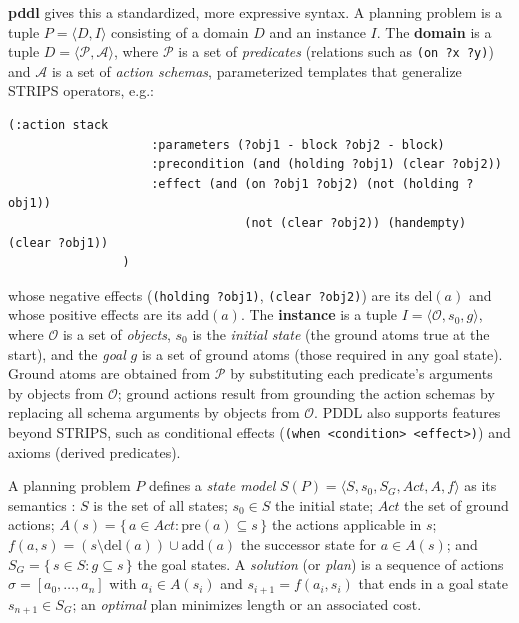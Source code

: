 \textbf{\ac{pddl}} \cite{aeronautiques1998pddl} gives this a standardized, more expressive syntax. A planning problem is a tuple $P = \langle D, I \rangle$ consisting of a domain $D$ and an instance $I$. The \textbf{domain} is a tuple $D = \langle \mathcal{P}, \mathcal{A} \rangle$, where $\mathcal{P}$ is a set of \textit{predicates} (relations such as \texttt{(on ?x ?y)}) and $\mathcal{A}$ is a set of \textit{action schemas}, parameterized templates that generalize STRIPS operators, e.g.:
            \begin{lstlisting}[style=PDDL,  label=lst:pddl_stack_action]
                (:action stack
                    :parameters (?obj1 - block ?obj2 - block)
                    :precondition (and (holding ?obj1) (clear ?obj2))
                    :effect (and (on ?obj1 ?obj2) (not (holding ?obj1))
                                 (not (clear ?obj2)) (handempty) (clear ?obj1))
                )

            \end{lstlisting}
whose negative effects (\texttt{(holding ?obj1)}, \texttt{(clear ?obj2)}) are its $\mathrm{del}(a)$ and whose positive effects are its $\mathrm{add}(a)$. The \textbf{instance} is a tuple $I = \langle \mathcal{O}, s_0, g \rangle$, where $\mathcal{O}$ is a set of \textit{objects}, $s_0$ is the \textit{initial state} (the ground atoms true at the start), and the \textit{goal} $g$ is a set of ground atoms (those required in any goal state). Ground atoms are obtained from $\mathcal{P}$ by substituting each predicate's arguments by objects from $\mathcal{O}$; ground actions result from grounding the action schemas by replacing all schema arguments by objects from $\mathcal{O}$. PDDL also supports features beyond STRIPS, such as conditional effects (\texttt{(when <condition> <effect>)}) and axioms (derived predicates).

A planning problem $P$ defines a \textit{state model} $S(P) = \langle S, s_0, S_G, Act, A, f \rangle$ as its semantics \cite{geffner2013concise, hofmann2024learning}: $S$ is the set of all states; $s_0 \in S$ the initial state; $Act$ the set of ground actions; $A(s) = \{\, a \in Act : \mathrm{pre}(a) \subseteq s \,\}$ the actions applicable in $s$; $f(a, s) = (s \setminus \mathrm{del}(a)) \cup \mathrm{add}(a)$ the successor state for $a \in A(s)$; and $S_G = \{\, s \in S : g \subseteq s \,\}$ the goal states. A \textit{solution} (or \textit{plan}) is a sequence of actions $\sigma = [a_0, \dots, a_n]$ with $a_i \in A(s_i)$ and $s_{i+1} = f(a_i, s_i)$ that ends in a goal state $s_{n+1} \in S_G$; an \textit{optimal} plan minimizes length or an associated cost.
